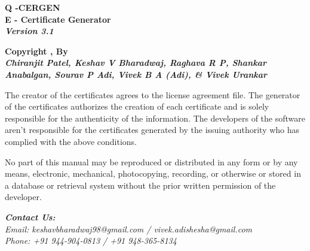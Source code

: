 

\begin{titlingpage}
	
\vspace{2cm}

\centering
{
	\Large{
		\textbf{Q -CERGEN}\\
		\textbf{E - Certificate Generator}\\
		\textbf{\textit{Version 3.1}}}
	\vspace{2cm}
	
	\Large\textbf{Copyright ,  By}\\
	\vspace{0.5cm}
	\large\textbf{\textit{Chiranjit Patel, Keshav V Bharadwaj, Raghava R P, Shankar Anabalgan, Sourav P Adi, Vivek B A (Adi), \& Vivek Urankar}}
	\vspace{2.5cm}
}


The creator of the certificates agrees to the license agreement file. The generator of the certificates authorizes the creation of each certificate and is solely responsible for the authenticity of the information. The developers of the software aren't responsible for the certificates generated by the issuing authority who has complied with the above conditions.

\vspace{2cm}

No part of this manual may be reproduced or distributed in any form or by any means, electronic, mechanical, photocopying, recording, or otherwise or stored in a database or retrieval system without the prior written permission of the developer.

\vspace{1cm}

\begin{flushleft}
	\textit{\textbf{Contact Us:}}\\
	\textit{Email: keshavbharadwaj98@gmail.com / vivek.adishesha@gmail.com}\\
	\textit{Phone: +91 944-904-0813 / +91 948-365-8134}
\end{flushleft}
	
	
	
	
\end{titlingpage}


